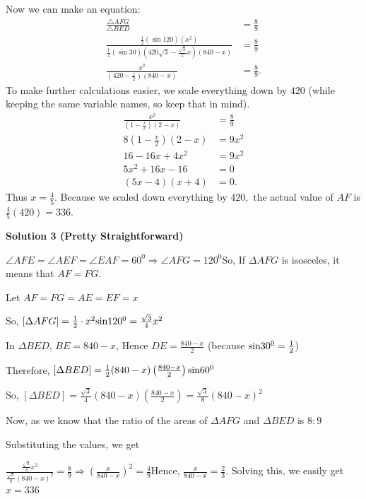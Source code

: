 \begin{enumerate}
 Now we can make an equation:
 \begin{align*} \frac{\triangle AFG}{\triangle BED} &= \frac{8}{9} \\ \frac{\frac{1}{2}(\sin 120)(x^2)}{\frac{1}{2}(\sin 30)\left(420\sqrt{3} - \frac{\sqrt{3}}{2}x\right)(840-x)} &= \frac{8}{9} \\ \frac{x^2}{\left(420 - \frac{x}{2}\right)(840-x)} &= \frac{8}{9}. \end{align*}
To make further calculations easier, we scale everything down by $420$ (while keeping the same variable names, so keep that in mind). 
 \begin{align*} \frac{x^2}{\left(1-\frac{x}{2}\right)(2-x)} &= \frac{8}{9} \\ 8\left(1-\frac{x}{2}\right)(2-x) &= 9x^2 \\ 16-16x + 4x^2 &= 9x^2 \\ 5x^2 + 16x -16 &= 0 \\ (5x-4)(x+4) &= 0. \end{align*}
Thus $x = \frac{4}{5}.$ Because we scaled down everything by $420,$ the actual value of $AF$ is $\frac{4}{5}(420) = \boxed{336}.$




\textbf{Solution 3 (Pretty Straightforward)}

$\angle AFE = \angle AEF = \angle EAF = 60^{0} \Rightarrow \angle AFG = 120^{0}$So, If $\Delta AFG$ is isosceles, it means that $AF = FG$.

 Let $AF = FG = AE = EF = x$

 So, $[\Delta AFG] = \frac{1}{2} \cdot x^{2} \textup{sin} 120^{0} = \frac{\sqrt{3}}{4}x^{2}$

 In $\Delta BED$, $BE = 840 - x$, Hence $DE = \frac{840 - x}{2}$ (because $\textup{sin} 30^{0} = \frac{1}{2}$)

 Therefore, $[\Delta BED] = \frac{1}{2} (840 - x) \left (\frac{840-x}{2} \right) \textup{sin} 60^{0}$

 So, $[\Delta BED] = \frac{\sqrt{3}}{4} (840 - x) \left (\frac{840-x}{2} \right) = \frac{\sqrt{3}}{8} (840 - x)^{2}$

 
Now, as we know that the ratio of the areas of $\Delta AFG$ and $\Delta BED$ is $8:9$

 Substituting the values, we get

 $\frac{\frac{\sqrt{3}}{4}x^{2}}{\frac{\sqrt{3}}{8} (840 - x)^{2}} = \frac{8}{9} \Rightarrow \left (\frac{x}{840 - x} \right)^{2} = \frac{4}{9}$Hence, $\frac{x}{840 - x} = \frac{2}{3}$. Solving this, we easily get $x = 336$


\end{enumerate}
